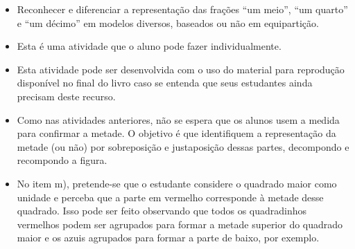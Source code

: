\Bg

\begin{objetivos}{}{}
\begin{itemize} %
    \item Reconhecer e diferenciar a representação das frações ``um meio'', ``um quarto'' e       ``um décimo'' em modelos diversos, baseados  ou não em equipartição.
\end{itemize} %
\end{objetivos}

\begin{orientacoes}
\begin{itemize} %
\item       Esta é uma atividade que o aluno pode fazer individualmente.
\item Esta atividade pode ser desenvolvida com o uso do material para reprodução disponível no final do livro caso se entenda que seus estudantes ainda precisam deste recurso.
\item Como nas atividades anteriores, não se espera que os alunos usem a medida para confirmar a metade. O objetivo é que identifiquem a representação da metade (ou não) por sobreposição e justaposição dessas partes, decompondo e recompondo a figura.
\item No item m), pretende-se que o estudante considere o quadrado maior como unidade e perceba que a parte em vermelho corresponde à metade desse quadrado. Isso pode ser feito observando que todos os quadradinhos vermelhos podem ser agrupados para formar a metade superior do quadrado maior e os azuis agrupados para formar a parte de baixo, por exemplo.
\begin{center}
\quad
{}
\end{center}


\end{itemize}
\end{orientacoes}
